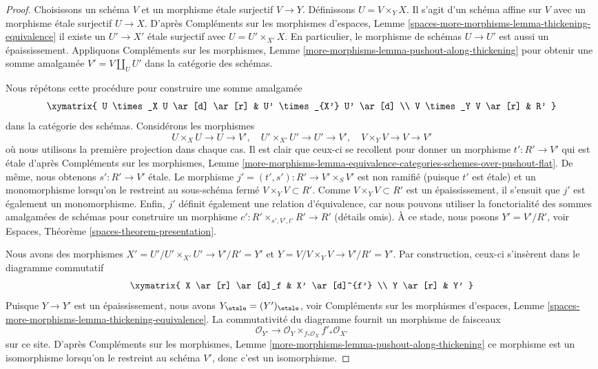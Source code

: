 \begin{proof}
Choisissons un schéma $V$ et un morphisme \'etale surjectif $V \to Y$.
Définissons $U = V \times_Y X$. Il s'agit d'un schéma affine sur $V$ avec un morphisme \'etale surjectif $U \to X$. D'après Compléments sur les morphismes d'espaces, Lemme \ref{spaces-more-morphisms-lemma-thickening-equivalence}
il existe un $U' \to X'$ \'etale surjectif avec $U = U' \times_{X'} X$. En particulier, le morphisme de schémas $U \to U'$ est aussi un épaississement. Appliquons Compléments sur les morphismes, Lemme \ref{more-morphisms-lemma-pushout-along-thickening}
pour obtenir une somme amalgamée $V' = V \amalg_U U'$ dans la catégorie des schémas.

\medskip\noindent
Nous répétons cette procédure pour construire une somme amalgamée
$$
\xymatrix{
U \times_X U \ar[d] \ar[r] & U' \times_{X'} U' \ar[d] \\
V \times_Y V \ar[r] & R'
}
$$
dans la catégorie des schémas. Considérons les morphismes
$$
U \times_X U \to U \to V',\quad
U' \times_{X'} U' \to U' \to V',\quad
V \times_Y V \to V \to V'
$$
où nous utilisons la première projection dans chaque cas. Il est clair que ceux-ci se recollent pour donner un morphisme $t' : R' \to V'$ qui est \'etale d'après
Compléments sur les morphismes, Lemme
\ref{more-morphisms-lemma-equivalence-categories-schemes-over-pushout-flat}.
De même, nous obtenons $s' : R' \to V'$ \'etale.
Le morphisme $j' = (t', s') : R' \to V' \times_S V'$ est non ramifié
(puisque $t'$ est \'etale) et un monomorphisme lorsqu'on le restreint au sous-schéma fermé $V \times_Y V \subset R'$. Comme $V \times_Y V \subset R'$ est
un épaississement, il s'ensuit que $j'$ est également un monomorphisme. Enfin, $j'$
définit également une relation d'équivalence, car nous pouvons utiliser la fonctorialité des sommes amalgamées
de schémas pour construire un morphisme $c' : R' \times_{s', V', t'} R' \to R'$
(détails omis). À ce stade, nous posons $Y' = V'/R'$, voir
Espaces, Théorème \ref{spaces-theorem-presentation}.

\medskip\noindent
Nous avons des morphismes $X' = U'/U' \times_{X'} U' \to V'/R' = Y'$ et
$Y = V/V \times_Y V \to V'/R' = Y'$.
Par construction, ceux-ci s'insèrent dans le diagramme commutatif
$$
\xymatrix{
X \ar[r] \ar[d]_f & X' \ar[d]^{f'} \\
Y \ar[r] & Y'
}
$$
Puisque $Y \to Y'$ est un épaississement, nous avons
$Y_\etale = (Y')_\etale$, voir Compléments sur les morphismes d'espaces,
Lemme \ref{spaces-more-morphisms-lemma-thickening-equivalence}.
La commutativité du diagramme fournit un morphisme de faisceaux
$$
\mathcal{O}_{Y'}
\longrightarrow
\mathcal{O}_Y \times_{f_*\mathcal{O}_X} f'_*\mathcal{O}_{X'}
$$
sur ce site. D'après Compléments sur les morphismes, Lemme
\ref{more-morphisms-lemma-pushout-along-thickening}
ce morphisme est un isomorphisme lorsqu'on le restreint au
schéma $V'$, donc c'est un isomorphisme.


\end{proof}
